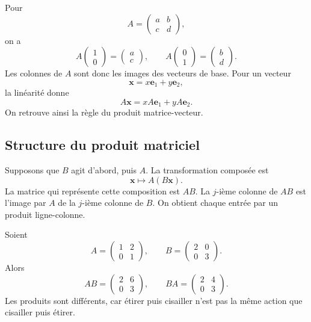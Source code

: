Pour
\[
A=
\begin{pmatrix}
a&b\\c&d
\end{pmatrix},
\]
on a
\[
A\begin{pmatrix}1\\0\end{pmatrix}
=
\begin{pmatrix}a\\c\end{pmatrix},
\qquad
A\begin{pmatrix}0\\1\end{pmatrix}
=
\begin{pmatrix}b\\d\end{pmatrix}.
\]
Les colonnes de $A$ sont donc les images des vecteurs de base. Pour un vecteur
\[
\mathbf x=x\mathbf e_1+y\mathbf e_2,
\]
la linéarité donne
\[
A\mathbf x=xA\mathbf e_1+yA\mathbf e_2.
\]
On retrouve ainsi la règle du produit matrice-vecteur.

\subsection{Structure du produit matriciel}

Supposons que $B$ agit d'abord, puis $A$. La transformation composée est
\[
\mathbf x\longmapsto A(B\mathbf x).
\]
La matrice qui représente cette composition est $AB$. La $j$-ième colonne de $AB$ est l'image par $A$ de la $j$-ième colonne de $B$. On obtient chaque entrée par un produit ligne-colonne.

\begin{examplebox}
Soient
\[
A=\begin{pmatrix}1&2\\0&1\end{pmatrix},
\qquad
B=\begin{pmatrix}2&0\\0&3\end{pmatrix}.
\]
Alors
\[
AB=\begin{pmatrix}2&6\\0&3\end{pmatrix},
\qquad
BA=\begin{pmatrix}2&4\\0&3\end{pmatrix}.
\]
Les produits sont différents, car étirer puis cisailler n'est pas la même action que cisailler puis étirer.
\end{examplebox}

